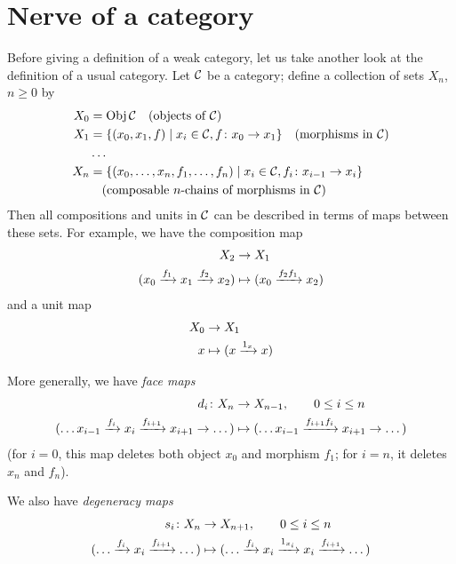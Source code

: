 \section{Nerve of a category}\label{s:nerve}
Before giving a definition of a weak category, let us take another look at the
definition of a usual category. Let $\mathcal{C}$ be a category; define a collection
of sets $X_n$, $n\ge 0$ by
\begin{equation}\label{e:nerve1}
  \begin{aligned}
    X_0&= \operatorname{Obj} \mathcal{C} \quad (\text{objects of $\mathcal{C}$})\\
    X_1&= \{ (x_0, x_1, f)\; | \; x_i \in \mathcal{C}, f\colon x_0\to x_1\}
                \quad (\text{morphisms in $\mathcal{C}$})\\
                &\dots\\
    X_n&=\{(x_0, \dots, x_n, f_1, \dots, f_n)\; | \;
           x_i \in \mathcal{C}, f_i\colon x_{i-1}\to x_i \}\\
            &\quad (\text{composable $n$-chains of morphisms in $\mathcal{C}$})\\
  \end{aligned}
\end{equation}
Then all compositions and units in $\mathcal{C}$ can be described in terms
of maps between these sets. For example, we have the composition map
\begin{align*}
  X_2&\to X_1\\
  (x_0\xrightarrow{f_1} x_1 \xrightarrow{f_2}x_2)&\mapsto (x_0\xrightarrow{f_2f_1} x_2)
\end{align*}
and a unit map
\begin{align*}
  X_0&\to X_1\\
  x&\mapsto (x\xrightarrow{1_x} x)
\end{align*}

More generally, we have \emph{face maps}
\begin{equation}\label{e:nerve2}
  \begin{aligned}
  d_i\colon X_n&\to X_{n-1}, \qquad 0\le i \le n\\
  (\dots x_{i-1}\xrightarrow{f_i} x_i \xrightarrow{f_{i+1}} x_{i+1}\to \dots)
  &\mapsto
  (\dots x_{i-1}\xrightarrow{f_{i+1}f_i} x_{i+1}\to \dots)
  \end{aligned}
\end{equation}
(for $i=0$, this map deletes both object $x_0$ and morphism $f_1$; for $i=n$,
it deletes $x_n$ and $f_n$).

We also have \emph{degeneracy maps}
\begin{equation}\label{e:nerve3}
  \begin{aligned}
  s_i\colon X_n&\to X_{n+1}, \qquad 0\le i \le n\\
  (\dots \xrightarrow{f_i} x_i \xrightarrow{f_{i+1}} \dots)
  &\mapsto
  (\dots \xrightarrow{f_i} x_i \xrightarrow{1_{x_i}} x_i \xrightarrow{f_{i+1}} \dots)
  \end{aligned}
\end{equation}

